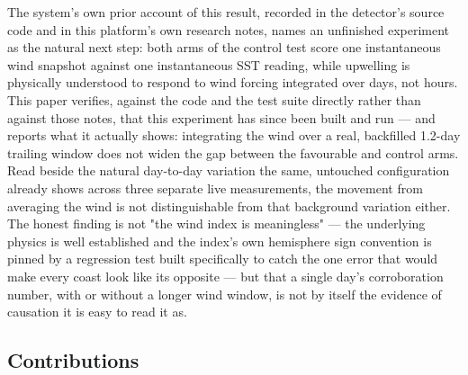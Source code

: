 The system's own prior account of this result, recorded in the detector's
source code and in this platform's own research notes, names an unfinished
experiment as the natural next step: both arms of the control test score one
instantaneous wind snapshot against one instantaneous SST reading, while
upwelling is physically understood to respond to wind forcing integrated
over days, not hours. This paper verifies, against the code and the test
suite directly rather than against those notes, that this experiment has
since been built and run --- and reports what it actually shows: integrating
the wind over a real, backfilled 1.2-day trailing window does not widen the
gap between the favourable and control arms. Read beside the natural
day-to-day variation the same, untouched configuration already shows across
three separate live measurements, the movement from averaging the wind is
not distinguishable from that background variation either. The honest
finding is not "the wind index is meaningless" --- the underlying physics is
well established and the index's own hemisphere sign convention is pinned by
a regression test built specifically to catch the one error that would make
every coast look like its opposite --- but that a single day's corroboration
number, with or without a longer wind window, is not by itself the evidence
of causation it is easy to read it as.

\subsection{Contributions}


